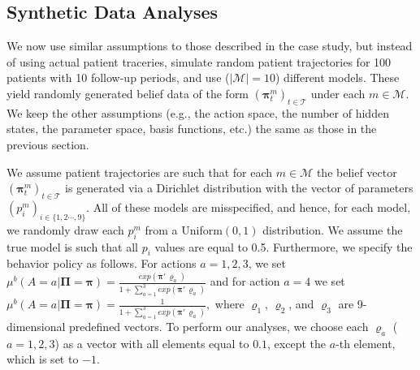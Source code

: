 \documentclass[opre,nonblindrev]{informs2}%
\newcommand{\1}{\hbox{\rm 1\kern-.35em 1}}
\newcommand{\MT}{\mathscr T}
\newcommand{\MM}{\mathscr M}
\newcommand{\bpi}{\boldsymbol{\pi}}
\newcommand{\bPi}{\boldsymbol{\Pi}}
\newcommand{\bvarrho}{\boldsymbol{\varrho}}
\begin{document}
\subsection{Synthetic Data Analyses}\label{sec:synthetic}
We now use similar assumptions to those described in the case study, but instead of using actual patient traceries, simulate random patient trajectories for 100 patients with 10 follow-up periods, and use ($|\MM|=10$) different models. These yield randomly generated belief data of the form $(\bpi^m_t)_{t\in\MT}$ under each $m \in\MM$.  We keep the other assumptions (e.g., the action space, the number of hidden states,  the parameter space, basis functions, etc.) the same as those in the previous section.

We assume patient trajectories are such that for each $m\in\MM$ the belief vector $(\bpi^m_t)_{t\in\MT}$ is generated via a Dirichlet distribution with the vector of parameters $(p^m_i)_{i\in\{1,2\cdots,9\}}$. All of these models are misspecified, and hence,  for each model, we randomly draw each $p^m_i$ from a Uniform$(0,1)$ distribution.  We assume the true model is such that all $p_i$ values are equal to 0.5. Furthermore, we specify the behavior policy as follows. For actions $a=1,2,3$, we set $\mu^b(A=a|\bPi=\bpi)=\frac{exp (\bpi' \, \bvarrho_a)}{1+\sum_{a=1}^3 exp (\bpi' \, \bvarrho_a)}$ and for action $a=4$ we set $\mu^b(A=a|\bPi=\bpi)=\frac{1}{1+\sum_{a=1}^3 exp (\bpi' \, \bvarrho_a)},$ where  $\bvarrho_1$, $\bvarrho_2$, and $\bvarrho_3$ are 9-dimensional predefined vectors. To perform our analyses, we choose  each $\bvarrho_a$ ($a=1,2,3$) as a vector with all elements equal to $0.1$, except the $a$-th element, which is set to $-1$.
\end{document}
